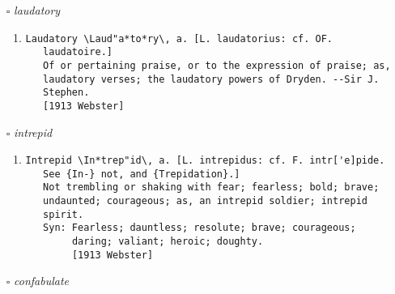 \documentclass{article}
\begin{document}
\begin{itemize}
\begin{enumerate}
\item{
\begin{lstlisting}
Seminal \Sem"i*nal\, a. [L. seminalis, fr. semen, seminis, seed,
   akin to serere to sow: cf. F. seminal. See {Sow} to scatter
   seed.]
   1. Pertaining to, containing, or consisting of, seed or
      semen; as, the seminal fluid.
      [1913 Webster]
   2. Contained in seed.
      [1913 Webster]
   3. Hence: Holding the first place in a series of developed
      results or consequents; serving as a source, or first
      principle; giving rise to related ideas or results;
      germinal; radical; primary; original; as, seminal
      principles of generation; seminal virtue; a seminal
      discovery.
      [1913 Webster +PJC]
            The idea of God is, beyond all question or
            comparison, the one great seminal principle. --Hare.
      [1913 Webster]
   {Seminal leaf} (Bot.), a seed leaf, or cotyleden.
   {Seminal receptacle}. (Zo["o]l.) Same as {Spermatheca}.
      [1913 Webster]
Seminal \Sem"i*nal\, n.
   A seed. [Obs.] --Sir T. Browne.
   [1913 Webster]
\end{lstlisting}}
\end{enumerate}
\item[$\square$] \emph{ laudatory }
\begin{enumerate}
\item{
\begin{lstlisting}
Laudatory \Laud"a*to*ry\, a. [L. laudatorius: cf. OF.
   laudatoire.]
   Of or pertaining praise, or to the expression of praise; as,
   laudatory verses; the laudatory powers of Dryden. --Sir J.
   Stephen.
   [1913 Webster]
\end{lstlisting}}
\end{enumerate}
\item[$\square$] \emph{ intrepid }
\begin{enumerate}
\item{
\begin{lstlisting}
Intrepid \In*trep"id\, a. [L. intrepidus: cf. F. intr['e]pide.
   See {In-} not, and {Trepidation}.]
   Not trembling or shaking with fear; fearless; bold; brave;
   undaunted; courageous; as, an intrepid soldier; intrepid
   spirit.
   Syn: Fearless; dauntless; resolute; brave; courageous;
        daring; valiant; heroic; doughty.
        [1913 Webster]
\end{lstlisting}}
\end{enumerate}
\item[$\square$] \emph{ confabulate }
\begin{enumerate}

\end{enumerate}
\end{itemize}
\end{document}
